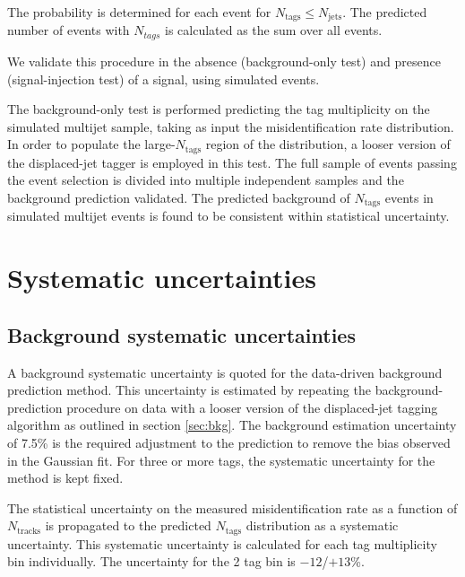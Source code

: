 The probability is determined for each event for $N_{\textrm{tags}} \leq N_{\textrm{jets}}$. The predicted number of events with
$N_{tags}$ is calculated as the sum over all events.

We validate this procedure in the absence (background-only test) and
presence (signal-injection test) of a signal, using simulated events.

The background-only test is performed predicting the tag multiplicity
on the simulated multijet sample, taking as input the misidentification rate
distribution. In order to populate the large-$N_{\textrm{tags}}$
region of the distribution, a looser version of the displaced-jet
tagger is employed in this test. The full sample of events passing the
event selection is divided into multiple independent samples and the background
prediction validated. The predicted background of $N_{\textrm{tags}}$ events
in simulated multijet events is found to be consistent within statistical uncertainty. 





\section{Systematic uncertainties}
\label{sec:sys}

\subsection{Background systematic uncertainties}
\label{sec:bkgsys}

A background systematic uncertainty is quoted for the data-driven background prediction
method. This uncertainty is estimated by repeating the
background-prediction procedure on data with a looser version of the
displaced-jet tagging algorithm as outlined in section \ref{sec:bkg}.  The
background estimation uncertainty of 7.5\% is the required adjustment
to the prediction to remove the bias observed in the Gaussian fit.  For three or more tags, the systematic uncertainty for the
method is kept fixed.

The statistical uncertainty on the measured misidentification rate as a
function of $N_{\textrm{tracks}}$ is propagated to the predicted
$N_{\textrm{tags}}$ distribution as a systematic uncertainty. This systematic uncertainty 
is calculated for each tag multiplicity bin individually. The uncertainty for the 2 tag
bin is ${-}12$/$+13$\%.

